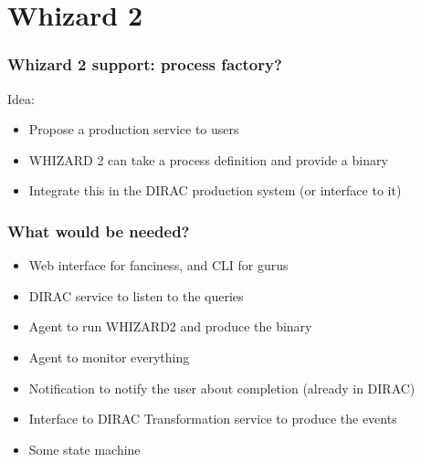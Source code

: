 \documentclass[10pt,table,dvipsnames]{beamer}
\begin{document}
\section{Whizard 2}
\label{sec:whiz2}
\begin{frame}
  \frametitle{Whizard 2 support: process factory?}
Idea:
\begin{itemize}
\item Propose a production service to users
\item WHIZARD 2 can take a process definition and provide a binary
\item Integrate this in the DIRAC production system (or interface to
  it)
\end{itemize}
\end{frame}
\begin{frame}
  \frametitle{What would be needed?}
  \begin{itemize}
  \item Web interface for fanciness, and CLI for gurus
  \item DIRAC service to listen to the queries
  \item Agent to run WHIZARD2 and produce the binary
  \item Agent to monitor everything
  \item Notification to notify the user about completion (already in DIRAC)
  \item Interface to DIRAC Transformation service to produce the
    events
  \item Some state machine
  \end{itemize}
\end{frame}
\end{document}
